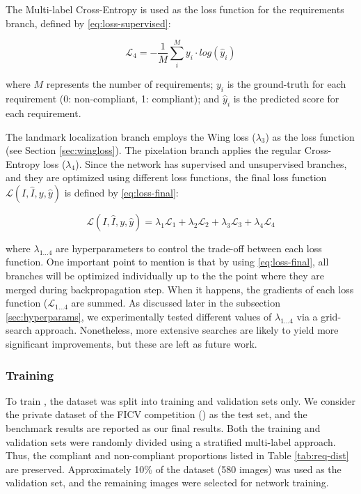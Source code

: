 The Multi-label Cross-Entropy is used as the loss function for the requirements branch, defined by \autoref{eq:loss-supervised}:
 
\begin{equation}
\label{eq:loss-supervised}
\mathcal{L}_4 = -\frac{1}{M} \sum_i^M {y_i \cdot log(\hat{y}_i)}
\end{equation}
 
\noindent where $M$ represents the number of requirements; $y_i$ is the ground-truth for each requirement (0: non-compliant, 1: compliant); and $\hat{y}_i$ is the predicted score for each requirement.
 
The landmark localization branch employs the Wing loss ($\lambda_3$) as the loss function (see Section \ref{sec:wingloss}). The pixelation branch applies the regular Cross-Entropy loss ($\lambda_4$). Since the network has supervised and unsupervised branches, and they are optimized using different loss functions, the final loss function $\mathcal{L}(I, \hat{I}, y, \hat{y})$ is defined by \autoref{eq:loss-final}:
 
\begin{equation}
\label{eq:loss-final}
\mathcal{L}(I, \hat{I}, y, \hat{y}) = \lambda_1\mathcal{L}_1 + \lambda_2\mathcal{L}_2 + \lambda_3\mathcal{L}_3 + \lambda_4\mathcal{L}_4
\end{equation}
 
\noindent where $\lambda_{1...4}$ are hyperparameters to control the trade-off between each loss function. One important point to mention is that by using \autoref{eq:loss-final}, all branches will be optimized individually up to the the point where they are merged during backpropagation step. When it happens, the gradients of each loss function ($\mathcal{L}_{1...4}$ are summed. As discussed later in the subsection \ref{sec:hyperparams}, we experimentally tested different values of $\lambda_{1...4}$ via a grid-search approach. Nonetheless, more extensive searches are likely to yield more significant improvements, but these are left as future work.
 
\subsubsection{Training} 
 
To train \methodname, the \adhoc dataset was split into training and validation sets only. We consider the private dataset of the FICV competition (\ficvofficial) as the test set, and the benchmark results are reported as our final results. Both the training and validation sets were randomly divided using a stratified multi-label approach. Thus, the compliant and non-compliant proportions listed in Table \ref{tab:req-dist} are preserved. Approximately 10\% of the dataset (580 images) was used as the validation set, and the remaining images were selected for network training.
 
